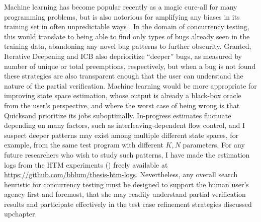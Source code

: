 Machine learning has become popular recently as a magic cure-all for many programming problems,
but is also notorious for amplifying any biases in its training set in often unpredictable ways
\cite{conceptnet-bias}.
In the domain of concurrency testing, this would translate to being able to find only types of bugs
already seen in the training data, abandoning any novel bug patterns to further obscurity.
Granted,
Iterative Deepening and
ICB also deprioritize ``deeper'' bugs,
as measured by number of unique or total preemptions, respectively,
but when a bug is not found
these strategies are also transparent enough that the user can understand the nature of the partial verification.
%
Machine learning would be more appropriate for improving state space estimation,
whose output is already a black-box oracle from the user's perspective,
and where the worst case of being wrong
is that Quicksand prioritize its jobs suboptimally. %
In-progress estimates fluctuate depending on many factors,
such as interleaving-dependent flow control,
and I suspect deeper patterns may exist among multiple different state spaces,
for example,
from the same test program with different $K,N$ parameters.
For any future researchers who wish to study such patterns,
I have made the estimation logs from the HTM experiments (\sect{\ref{sec:tm-eval}})
freely available at \url{https://github.com/bblum/thesis-htm-logs}.
%
Nevertheless,
any overall search heuristic for concurrency testing
must be designed to support the human user's agency first and foremost,
that she may readily understand partial verification results
and participate effectively in the test case refinement strategies discussed
upchapter. %




